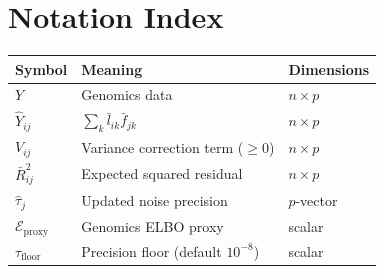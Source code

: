 \documentclass[11pt]{article}
\newcommand{\lbar}[2]{\bar{l}_{#1#2}}
\newcommand{\fbar}[2]{\bar{f}_{#1#2}}
\begin{document}
\appendix
\section{Notation Index}

\begin{tabular}{lll}
\toprule
Symbol & Meaning & Dimensions \\
\midrule
$Y$ & Genomics data & $n \times p$ \\
$\hat{Y}_{ij}$ & $\sum_k\lbar{i}{k}\fbar{j}{k}$ & $n \times p$ \\
$V_{ij}$ & Variance correction term ($\geq 0$) & $n \times p$ \\
$\bar{R}^2_{ij}$ & Expected squared residual & $n \times p$ \\
$\hat{\tau}_j$ & Updated noise precision & $p$-vector \\
$\mathcal{E}_{\text{proxy}}$ & Genomics ELBO proxy & scalar \\
$\tau_{\text{floor}}$ & Precision floor (default $10^{-8}$) & scalar \\
\bottomrule
\end{tabular}
\end{document}
